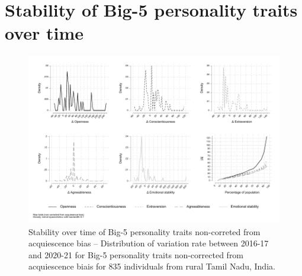 \documentclass[a4paper, 11pt, onecolumn]{article}
\begin{document}



\section{Stability of Big-5 personality traits over time}
\label{section:stab_big5}



\begin{figure}[!htb]
\raggedright
\includegraphics[scale=0.86]{INPUT/deltacont_raw}
\caption{Stability over time of Big-5 personality traits non-correted from acquiescence bias -- Distribution of variation rate between 2016-17 and 2020-21 for Big-5 personality traits non-corrected from acquiescence biais for 835 individuals from rural Tamil Nadu, India.}
\label{fig:stabraw}
\end{figure}
\end{document}
